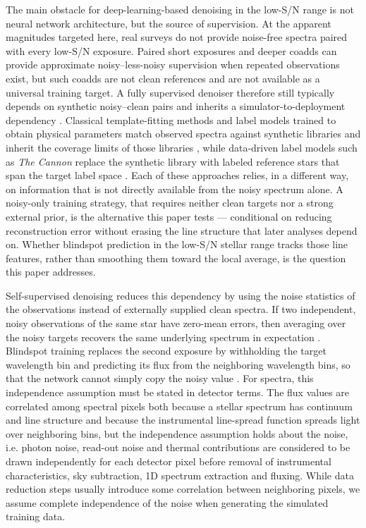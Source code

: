 \documentclass[twocolumn]{aastex7}
\begin{document}
The main obstacle for deep-learning-based denoising in the low-S/N range is not neural network architecture, but the source of supervision. At the apparent magnitudes targeted here, real surveys do not provide noise-free spectra paired with every low-S/N exposure. Paired short exposures and deeper coadds can provide approximate noisy--less-noisy supervision when repeated observations exist, but such coadds are not clean references and are not available as a universal training target. A fully supervised denoiser therefore still typically depends on synthetic noisy--clean pairs and inherits a simulator-to-deployment dependency \citep{Pal2024_denoising_autoencoder}. Classical template-fitting methods and label models trained to obtain physical parameters match observed spectra against synthetic libraries and inherit the coverage limits of those libraries \citep{Koleva2009_ULySS,Ting2019_Payne}, while data-driven label models such as \textit{The Cannon} replace the synthetic library with labeled reference stars that span the target label space \citep{Ness2015_Cannon}. Each of these approaches relies, in a different way, on information that is not directly available from the noisy spectrum alone. A noisy-only training strategy, that requires neither clean targets nor a strong external prior, is the alternative this paper tests --- conditional on reducing reconstruction error without erasing the line structure that later analyses depend on. Whether blindspot prediction in the low-S/N stellar range tracks those line features, rather than smoothing them toward the local average, is the question this paper addresses.

Self-supervised denoising reduces this dependency by using the noise statistics of the observations instead of externally supplied clean spectra. If two independent, noisy observations of the same star have zero-mean errors, then averaging over the noisy targets recovers the same underlying spectrum in expectation \citep{lehtinen2018noise2noise}. Blindspot training replaces the second exposure by withholding the target wavelength bin and predicting its flux from the neighboring wavelength bins, so that the network cannot simply copy the noisy value \citep{batson2019noise2self,Krull2019_blindspot,Laine2019_BSN}. For spectra, this independence assumption must be stated in detector terms. The flux values are correlated among spectral pixels both because a stellar spectrum has continuum and line structure and because the instrumental line-spread function spreads light over neighboring bins, but the independence assumption holds about the noise, i.e. photon noise, read-out noise and thermal contributions are considered to be drawn independently for each detector pixel before removal of instrumental characteristics, sky subtraction, 1D spectrum extraction and fluxing. While data reduction steps usually introduce some correlation between neighboring pixels, we assume complete independence of the noise when generating the simulated training data.
\end{document}
